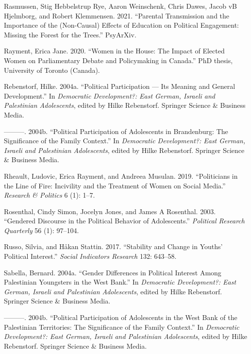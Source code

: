 \documentclass[
  letterpaper,
  DIV=11,
  numbers=noendperiod]{scrreprt}
\newlength{\cslhangindent}
\newenvironment{CSLReferences}[2] %
 {\begin{list}{}{%
  \setlength{\itemindent}{0pt}
  \setlength{\leftmargin}{0pt}
  \setlength{\parsep}{0pt}
  \ifodd #1
   \setlength{\leftmargin}{\cslhangindent}
   \setlength{\itemindent}{-1\cslhangindent}
  \fi
  \setlength{\itemsep}{#2\baselineskip}}}
 {\end{list}}
\begin{document}
\begin{CSLReferences}{1}{0}
Rasmussen, Stig Hebbelstrup Rye, Aaron Weinschenk, Chris Dawes, Jacob vB
Hjelmborg, and Robert Klemmensen. 2021. {``{Parental Transmission and
the Importance of the (Non-Causal) Effects of Education on Political
Engagement: Missing the Forest for the Trees}.''} PsyArXiv.

Rayment, Erica Jane. 2020. {``{Women in the House: The Impact of Elected
Women on Parliamentary Debate and Policymaking in Canada}.''} PhD
thesis, University of Toronto (Canada).

Rebenstorf, Hilke. 2004a. {``{Political Participation --- Its Meaning
and General Development}.''} In \emph{{Democratic Development?: East
German, Israeli and Palestinian Adolescents}}, edited by Hilke
Rebenstorf. Springer Science \& Business Media.

---------. 2004b. {``{Political Participation of Adolescents in
Brandenburg: The Significance of the Family Context}.''} In
\emph{{Democratic Development?: East German, Israeli and Palestinian
Adolescents}}, edited by Hilke Rebenstorf. Springer Science \& Business
Media.

Rheault, Ludovic, Erica Rayment, and Andreea Musulan. 2019.
{``{Politicians in the Line of Fire: Incivility and the Treatment of
Women on Social Media}.''} \emph{Research \& Politics} 6 (1): 1--7.

Rosenthal, Cindy Simon, Jocelyn Jones, and James A Rosenthal. 2003.
{``{Gendered Discourse in the Political Behavior of Adolescents}.''}
\emph{Political Research Quarterly} 56 (1): 97--104.

Russo, Silvia, and Håkan Stattin. 2017. {``Stability and Change in
Youths' Political Interest.''} \emph{Social Indicators Research} 132:
643--58.

Sabella, Bernard. 2004a. {``{Gender Differences in Political Interest
Among Palestinian Youngsters in the West Bank}.''} In \emph{{Democratic
Development?: East German, Israeli and Palestinian Adolescents}}, edited
by Hilke Rebenstorf. Springer Science \& Business Media.

---------. 2004b. {``{Political Participation of Adolescents in the West
Bank of the Palestinian Territories: The Significance of the Family
Context}.''} In \emph{{Democratic Development?: East German, Israeli and
Palestinian Adolescents}}, edited by Hilke Rebenstorf. Springer Science
\& Business Media.


\end{CSLReferences}
\end{document}
